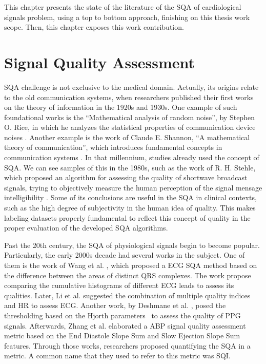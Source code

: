 

This chapter presents the state of the literature of the \gls{SQA} of cardiological signals problem, using a top to bottom approach, finishing on this thesis work scope. Then, this chapter exposes this work contribution.

\section{Signal Quality Assessment}

\gls{SQA} challenge is not exclusive to the medical domain. Actually, its origins relate to the old communication systems, when researchers published their first works on the theory of information in the 1920s and 1930s. One example of such foundational works is the ``Mathematical analysis of random noise'', by Stephen O. Rice, in which he analyzes the statistical properties of communication device noises \cite{origins-1}. Another example is the work of Claude E. Shannon, ``A mathematical theory of communication'', which introduces fundamental concepts in communication systems \cite{origins-2}. In that millennium, studies already used the concept of \gls{SQA}. We can see samples of this in the 1980s, such as the work of R. H. Stehle, which proposed an algorithm for assessing the quality of shortwave broadcast signals, trying to objectively measure the human perception of the signal mensage intelligibility \cite{origins-3}. Some of its conclusions are useful in the \gls{SQA} in clinical contexts, such as the high degree of subjectivity in the human idea of quality. This makes labeling datasets properly fundamental to reflect this concept of quality in the proper evaluation of the developed \gls{SQA} algorithms.
	
Past the 20th century, the \gls{SQA} of physiological signals begin to become popular. Particularly, the early 2000s decade had several works in the subject. One of them is the work of Wang et al. \cite{2000s-1}, which proposed a \gls{ECG} \gls{SQA} method based on the difference between the areas of distinct QRS complexes. The work propose comparing the cumulative histograms of different \gls{ECG} leads to assess its qualities. Later,  Li et al. \cite{2000s-2} suggested the combination of multiple quality indices and \gls{HR} to assess \gls{ECG}. Another work, by Deshmane et al. \cite{2000s-3}, posed the thresholding based on the Hjorth parameters~\cite{hjorth-parameters} to assess the quality of \gls{PPG} signals. Afterwards, Zhang et al. \cite{2000s-4} elaborated a \gls{ABP} signal quality assessment metric based on the End Diastole Slope Sum and Slow Ejection Slope Sum features. Through those works, researchers proposed quantifying the \gls{SQA} in a metric. A common name that they used to refer to this metric was \gls{SQI}.


